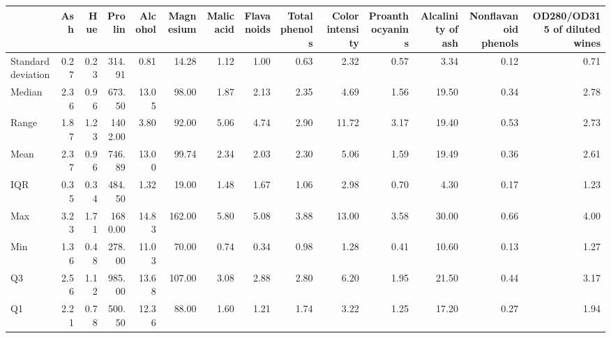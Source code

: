 \begin{tabular}{lrrrrrrrrrrrrr}
\toprule
 & Ash & Hue & Prolin & Alcohol & Magnesium & Malic acid & Flavanoids & Total phenols & Color intensity & Proanthocyanins & Alcalinity of ash & Nonflavanoid phenols & OD280/OD315 of diluted wines \\
\midrule
Standard deviation & 0.27 & 0.23 & 314.91 & 0.81 & 14.28 & 1.12 & 1.00 & 0.63 & 2.32 & 0.57 & 3.34 & 0.12 & 0.71 \\
Median & 2.36 & 0.96 & 673.50 & 13.05 & 98.00 & 1.87 & 2.13 & 2.35 & 4.69 & 1.56 & 19.50 & 0.34 & 2.78 \\
Range & 1.87 & 1.23 & 1402.00 & 3.80 & 92.00 & 5.06 & 4.74 & 2.90 & 11.72 & 3.17 & 19.40 & 0.53 & 2.73 \\
Mean & 2.37 & 0.96 & 746.89 & 13.00 & 99.74 & 2.34 & 2.03 & 2.30 & 5.06 & 1.59 & 19.49 & 0.36 & 2.61 \\
IQR & 0.35 & 0.34 & 484.50 & 1.32 & 19.00 & 1.48 & 1.67 & 1.06 & 2.98 & 0.70 & 4.30 & 0.17 & 1.23 \\
Max & 3.23 & 1.71 & 1680.00 & 14.83 & 162.00 & 5.80 & 5.08 & 3.88 & 13.00 & 3.58 & 30.00 & 0.66 & 4.00 \\
Min & 1.36 & 0.48 & 278.00 & 11.03 & 70.00 & 0.74 & 0.34 & 0.98 & 1.28 & 0.41 & 10.60 & 0.13 & 1.27 \\
Q3 & 2.56 & 1.12 & 985.00 & 13.68 & 107.00 & 3.08 & 2.88 & 2.80 & 6.20 & 1.95 & 21.50 & 0.44 & 3.17 \\
Q1 & 2.21 & 0.78 & 500.50 & 12.36 & 88.00 & 1.60 & 1.21 & 1.74 & 3.22 & 1.25 & 17.20 & 0.27 & 1.94 \\
\bottomrule
\end{tabular}

